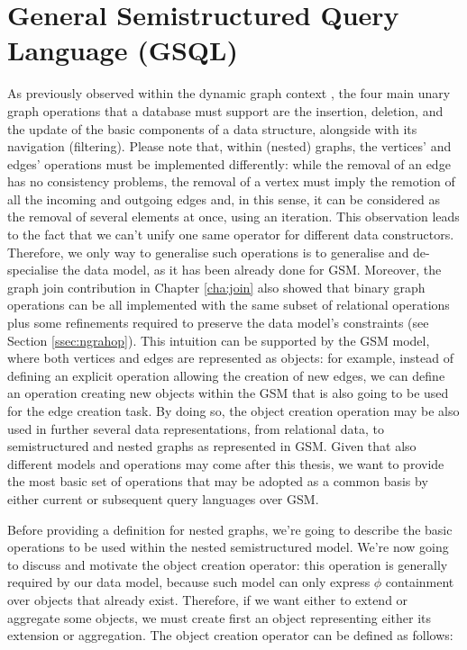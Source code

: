 \section{General Semistructured Query Language (GSQL)}\label{sec:gsqldef}
As previously observed within the dynamic graph context \cite{Demetrescu2010}, the four main unary graph operations that a database must support are the insertion,  deletion, and the update of the basic components of a data structure, alongside with its navigation (filtering). Please note that, within  (nested) graphs, the vertices' and edges' operations must be implemented differently: while the removal of an edge has no consistency problems, the removal of a vertex must imply the remotion of all the incoming and outgoing edges and, in this sense, it can be considered as the removal of several elements at once, using an iteration. This observation leads to the fact that we can't unify one same operator for different data constructors. Therefore, we only way to generalise such operations is to generalise and de-specialise the data model, as it has been already done for GSM. Moreover, the graph join contribution in Chapter \ref{cha:join} also showed that binary graph operations can be all implemented with the same subset of relational operations plus some refinements required to preserve the data model's constraints (see Section \vref{ssec:ngrahop}). This intuition can be supported by the GSM model, where both vertices and edges are represented as objects: %
for example, instead of defining an explicit operation allowing the creation of new edges, we can  define an operation creating new objects within the GSM that is also going to be used for the edge creation task. By doing so, the object creation operation may be also used in further several data representations, from relational data, to semistructured and nested graphs as represented in GSM. Given that also different models and operations may come after this thesis, we want to provide the most basic set of operations that may be adopted  as a common basis by either current or subsequent query languages over GSM. 

Before providing a definition for nested graphs, we're going to describe the basic operations to be used within the nested semistructured model. We're now going to discuss and motivate the object creation operator: this operation is generally required by our data model, because such model can only express $\phi$ containment over objects that already exist. Therefore, if we want either to extend  or aggregate some objects, we must create first an object representing either its extension or  aggregation. The object creation operator can be defined as follows:


